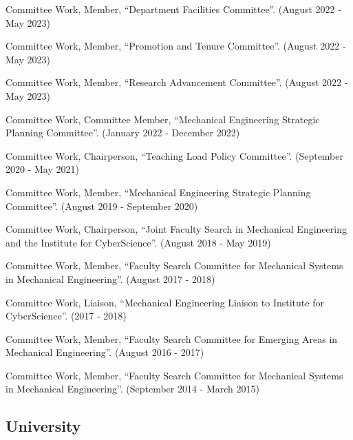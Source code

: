 \documentclass[a4paper,10pt]{article}
\begin{document}
        \noindent Committee Work, Member, ``Department Facilities Committee''. (August 2022 - May 2023)\vspace{0.25cm}
        
        \noindent Committee Work, Member, ``Promotion and Tenure Committee''. (August 2022 - May 2023)\vspace{0.25cm}
        
        \noindent Committee Work, Member, ``Research Advancement Committee''. (August 2022 - May 2023)\vspace{0.25cm}
        
        \noindent Committee Work, Committee Member, ``Mechanical Engineering Strategic Planning Committee''. (January 2022 - December 2022)\vspace{0.25cm}
        
        \noindent Committee Work, Chairperson, ``Teaching Load Policy Committee''. (September 2020 - May 2021)\vspace{0.25cm}
        
        \noindent Committee Work, Member, ``Mechanical Engineering Strategic Planning Committee''. (August 2019 - September 2020)\vspace{0.25cm}
        
        \noindent Committee Work, Chairperson, ``Joint Faculty Search in Mechanical Engineering and the Institute for CyberScience''. (August 2018 - May 2019)\vspace{0.25cm}
        
        \noindent Committee Work, Member, ``Faculty Search Committee for Mechanical Systems in Mechanical Engineering''. (August 2017 - 2018)\vspace{0.25cm}
        
        \noindent Committee Work, Liaison, ``Mechanical Engineering Liaison to Institute for CyberScience''. (2017 - 2018)\vspace{0.25cm}
        
        \noindent Committee Work, Member, ``Faculty Search Committee for Emerging Areas in Mechanical Engineering''. (August 2016 - 2017)\vspace{0.25cm}
        
        \noindent Committee Work, Member, ``Faculty Search Committee for Mechanical Systems in Mechanical Engineering''. (September 2014 - March 2015)\vspace{0.25cm}
        
    \subsection*{University}
    
\end{document}
